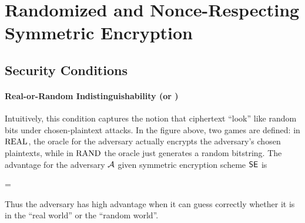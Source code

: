 \section{Randomized and Nonce-Respecting Symmetric Encryption}
\label{sec:symenc}

\subsection{Security Conditions}

\paragraph{Real-or-Random Indistinguishability (\INDRAND or \ROR)}


Intuitively, this condition captures the notion that ciphertext ``look'' like
random bits under chosen-plaintext attacks. In the figure above, two
games are defined: in $\textnormal{REAL}$, the oracle for the adversary actually
encrypts the adversary's chosen plaintexts, while in $\textnormal{RAND}$ the oracle
just generates a random bitstring. The advantage for the adversary ${\mathcal A}$ given
symmetric encryption scheme $\textnormal{\textsf{SE}}$ is

\bnm
\AdvROR{\SE}{\advA} =
\enm

Thus the adversary has high advantage when it can guess correctly whether it is
in the ``real world'' or the ``random world''.

